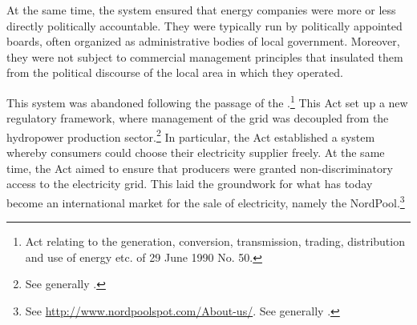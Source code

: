 At the same time, the system ensured that energy companies were more or less directly politically accountable. They were typically run by politically appointed boards, often organized as administrative bodies of local government. Moreover, they were not subject to commercial management principles that insulated them from the political discourse of the local area in which they operated.

This system was abandoned following the passage of the \cite{ea90}.\footnote{Act relating to the generation, conversion, transmission, trading, distribution and use of energy etc. of 29 June 1990 No. 50.} This Act set up a new regulatory framework, where management of the grid was decoupled from the hydropower production sector.\footnote{See generally \cite{bibow11}.} In particular, the Act established a system whereby consumers could choose their electricity supplier freely. At the same time, the Act aimed to ensure that producers were granted non-discriminatory access to the electricity grid. This laid the groundwork for what has today become an international market for the sale of electricity, namely the NordPool.\footnote{See \url{http://www.nordpoolspot.com/About-us/}. See generally \cite{skjold07,galtung07}.}

